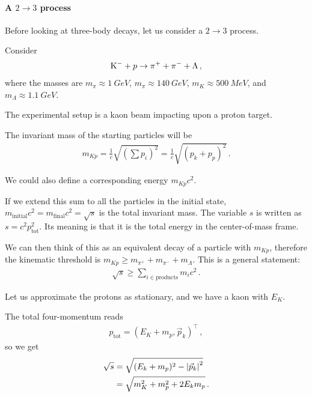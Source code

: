 \documentclass[main.tex]{subfiles}
\begin{document}
\paragraph{A \(2 \to 3\) process}


Before looking at three-body decays, let us consider a \(2 \to 3 \) process. 

Consider 
%
\begin{align}
\ce{K}^{-} + p \to \pi^{+} + \pi^{-} + \Lambda 
\,,
\end{align}
%
where the masses are \(m_\pi \approx \SI{1}{GeV}\), \(m_ \pi \approx \SI{140}{GeV}\), \(m_K \approx \SI{500}{MeV}\), and \(m_\Lambda \approx \SI{1.1}{GeV}\). 

The experimental setup is a kaon beam impacting upon a proton target. 

The invariant mass of the starting particles will be 
%
\begin{align}
m_{Kp} = \frac{1}{c} \sqrt{(\sum  p_i)^2}
 = \frac{1}{c} \sqrt{(p_k + p_p)^2}
\,.
\end{align}

We could also define a corresponding energy \(m_{Kp} c^2\). 

If we extend this sum to all the particles in the initial state, \(m _{\text{initial}} c^2 =  m_{\text{final}}c^2 = \sqrt{s}\) is the total invariant mass. 
The variable \(s\) is written as \(s = c^2 p^2 _{\text{tot}}\). 
Its meaning is that it is the total energy in the center-of-mass frame. 

We can then think of this as an equivalent decay of a particle with \(m_{Kp}\), therefore the kinematic threshold is \(m_{Kp} \geq m_{\pi^{+}} + m_{\pi^{-}} + m_\Lambda \). 
This is a general statement: 
%
\begin{align}
\sqrt{s} \geq \sum _{i \in \text{products}} m_i c^2
\,.
\end{align}

Let us approximate the protons as stationary, and we have a kaon with \(E_K\).

The total four-momentum reads 
%
\begin{align}
p _{\text{tot}} = (E_K + m_p, \vec{p}_k)^{\top}
\,,
\end{align}
%
so we get 
%
\begin{align}
\sqrt{s} &= \sqrt{(E_k + m_p)^2 - \abs{\vec{p}_k}^2}  \\
&=\sqrt{m_K^2 + m_p^2 + 2 E_k m_p}
\,.
\end{align}
\end{document}
